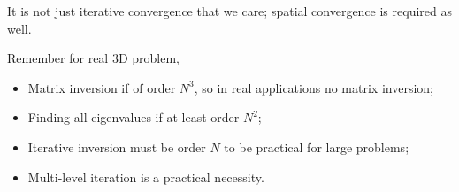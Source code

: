 \documentclass{school-22.211-notes}
\begin{document}
It is not just iterative convergence that we care; spatial convergence is required as well. 

Remember for real 3D problem,
\begin{itemize}
\item Matrix inversion if of order $N^3$, so in real applications no matrix inversion;
\item Finding all eigenvalues if at least order $N^2$;
\item Iterative inversion must be order $N$ to be practical for large problems;
\item Multi-level iteration is a practical necessity. 
\end{itemize}
\end{document}
